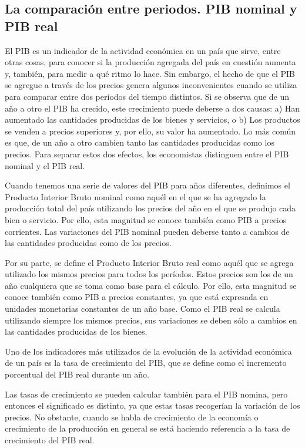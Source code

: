 \documentclass[
]{krantz}
\begin{document}
\hypertarget{la-comparaciuxf3n-entre-periodos.-pib-nominal-y-pib-real}{%
\subsection{La comparación entre periodos. PIB nominal y PIB real}\label{la-comparaciuxf3n-entre-periodos.-pib-nominal-y-pib-real}}

El PIB es un indicador de la actividad económica en un país que sirve, entre otras cosas, para conocer si la producción agregada del país en cuestión aumenta y, también, para medir a qué ritmo lo hace. Sin embargo, el hecho de que el PIB se agregue a través de los precios genera algunos inconvenientes cuando se utiliza para comparar entre dos períodos del tiempo distintos. Si se observa que de un año a otro el PIB ha crecido, este crecimiento puede deberse a dos causas:
a) Han aumentado las cantidades producidas de los bienes y servicios, o
b) Los productos se venden a precios superiores y, por ello, su valor ha aumentado.
Lo más común es que, de un año a otro cambien tanto las cantidades producidas como los precios. Para separar estos dos efectos, los economistas distinguen entre el PIB nominal y el PIB real.

Cuando tenemos una serie de valores del PIB para años diferentes, definimos el Producto Interior Bruto nominal como aquél en el que se ha agregado la producción total del país utilizando los precios del año en el que se produjo cada bien o servicio. Por ello, esta magnitud se conoce también como PIB a precios corrientes. Las variaciones del PIB nominal pueden deberse tanto a cambios de las cantidades producidas como de los precios.

Por su parte, se define el Producto Interior Bruto real como aquél que se agrega utilizado los mismos precios para todos los períodos. Estos precios son los de un año cualquiera que se toma como base para el cálculo. Por ello, esta magnitud se conoce también como PIB a precios constantes, ya que está expresada en unidades monetarias constantes de un año base. Como el PIB real se calcula utilizando siempre los mismos precios, sus variaciones se deben sólo a cambios en las cantidades producidas de los bienes.

Uno de los indicadores más utilizados de la evolución de la actividad económica de un país es la tasa de crecimiento del PIB, que se define como el incremento porcentual del PIB real durante un año.

Las tasas de crecimiento se pueden calcular también para el PIB nomina, pero entonces el significado es distinto, ya que estas tasas recogerían la variación de los precios. No obstante, cuando se habla de crecimiento de la economía o crecimiento de la producción en general se está haciendo referencia a la tasa de crecimiento del PIB real.
\end{document}
